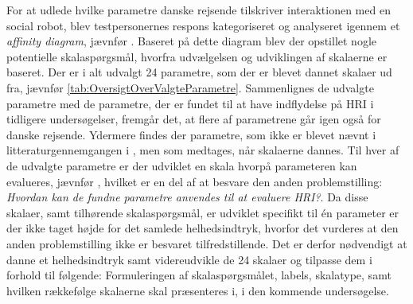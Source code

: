 \noindent
%
For at udlede hvilke parametre danske rejsende tilskriver interaktionen med en social robot, blev testpersonernes respons kategoriseret og analyseret igennem et \textit{affinity diagram}, jævnfør . Baseret på dette diagram blev der opstillet nogle potentielle skalaspørgsmål, hvorfra udvælgelsen og udviklingen af skalaerne er baseret. Der er i alt udvalgt 24 parametre, som der er blevet dannet skalaer ud fra, jævnfør \autoref{tab:OversigtOverValgteParametre}. Sammenlignes de udvalgte parametre med de parametre, der er fundet til at have indflydelse på HRI i tidligere undersøgelser, fremgår det, at flere af parametrene går igen også for danske rejsende. Ydermere findes der parametre, som ikke er blevet nævnt i litteraturgennemgangen i , men som medtages, når skalaerne dannes.\blankline
%
Til hver af de udvalgte parametre er der udviklet en skala hvorpå parameteren kan evalueres, jævnfør , hvilket er en del af at besvare den anden problemstilling: \textit{Hvordan kan de fundne parametre anvendes til at evaluere HRI?}. Da disse skalaer, samt tilhørende skalaspørgsmål, er udviklet specifikt til én parameter er der ikke taget højde for det samlede helhedsindtryk, hvorfor det vurderes at den anden problemstilling ikke er besvaret tilfredstillende. Det er derfor nødvendigt at danne et helhedsindtryk samt videreudvikle de 24 skalaer og tilpasse dem i forhold til følgende: Formuleringen af skalaspørgsmålet, labels, skalatype, samt hvilken rækkefølge skalaerne skal præsenteres i, i den kommende undersøgelse.    





